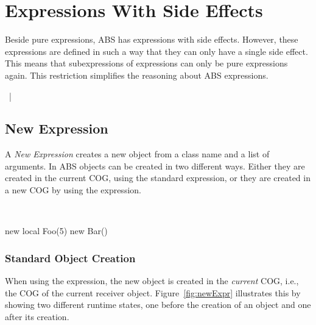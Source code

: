 \chapter{Expressions With Side Effects}
Beside pure expressions, ABS has expressions with side effects.
However, these expressions are defined in such a way that they can only have a
single side effect. This means that subexpressions of expressions can only be
pure expressions again. This restriction simplifies the reasoning about ABS
expressions.

\begin{abssyntax}
     {}
         ~|~ \\
  {}
           {}
           {}
           {}
\end{abssyntax}

\section{New Expression}
A \emph{New Expression} creates a new object from a class name and a list of arguments. In ABS objects can be created in two different ways.
Either they are created in the current COG, using the standard  expression,
or they are created in a new COG by using the  expression.

\begin{abssyntax}
  {}\ \ \ \TRS{(}  \TRS{)}  
\end{abssyntax}

\begin{absexample}
new local Foo(5)
new Bar()
\end{absexample}

\subsection{Standard Object Creation}
When using the  expression, the new object is created in the \emph{current} COG, i.e., the COG of the current receiver object.
Figure~\ref{fig:newExpr} illustrates this by showing two different runtime states, one before the creation of an object  and one after its creation.

